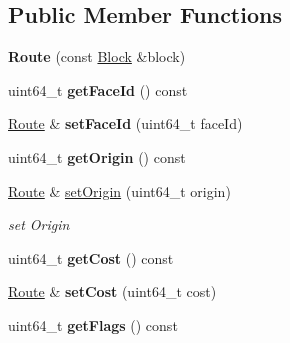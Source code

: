\subsection*{Public Member Functions}
\begin{DoxyCompactItemize}
\item 
{\bfseries Route} (const \hyperlink{classndn_1_1Block}{Block} \&block)\hypertarget{classndn_1_1nfd_1_1Route_a75f3b9b552e96d9191d94edf130d8a3c}{}\label{classndn_1_1nfd_1_1Route_a75f3b9b552e96d9191d94edf130d8a3c}

\item 
uint64\+\_\+t {\bfseries get\+Face\+Id} () const\hypertarget{classndn_1_1nfd_1_1Route_a6ccbfb15e8b4f31234896ead474fde25}{}\label{classndn_1_1nfd_1_1Route_a6ccbfb15e8b4f31234896ead474fde25}

\item 
\hyperlink{classndn_1_1nfd_1_1Route}{Route} \& {\bfseries set\+Face\+Id} (uint64\+\_\+t face\+Id)\hypertarget{classndn_1_1nfd_1_1Route_aa01770ac4c6e60725d62ef2a183775b2}{}\label{classndn_1_1nfd_1_1Route_aa01770ac4c6e60725d62ef2a183775b2}

\item 
uint64\+\_\+t {\bfseries get\+Origin} () const\hypertarget{classndn_1_1nfd_1_1Route_adbe2151ec673da79b4485a73c1c47e29}{}\label{classndn_1_1nfd_1_1Route_adbe2151ec673da79b4485a73c1c47e29}

\item 
\hyperlink{classndn_1_1nfd_1_1Route}{Route} \& \hyperlink{classndn_1_1nfd_1_1Route_adf2f3573a2b232833cbcb06099590246}{set\+Origin} (uint64\+\_\+t origin)
\begin{DoxyCompactList}\small\item\em set Origin \end{DoxyCompactList}\item 
uint64\+\_\+t {\bfseries get\+Cost} () const\hypertarget{classndn_1_1nfd_1_1Route_aab02dd1ae1635648e9fc5b1bf0c37edc}{}\label{classndn_1_1nfd_1_1Route_aab02dd1ae1635648e9fc5b1bf0c37edc}

\item 
\hyperlink{classndn_1_1nfd_1_1Route}{Route} \& {\bfseries set\+Cost} (uint64\+\_\+t cost)\hypertarget{classndn_1_1nfd_1_1Route_af94e1e91b6216a3eaa7f642f1e04c4aa}{}\label{classndn_1_1nfd_1_1Route_af94e1e91b6216a3eaa7f642f1e04c4aa}

\item 
uint64\+\_\+t {\bfseries get\+Flags} () const\hypertarget{classndn_1_1nfd_1_1Route_aa55e9fd0b16a27074dddb322424a1f17}{}\label{classndn_1_1nfd_1_1Route_aa55e9fd0b16a27074dddb322424a1f17}


\end{DoxyCompactItemize}

